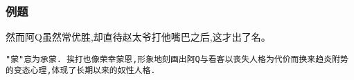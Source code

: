 \documentclass{ctexart}
\begin{document}
\subsubsection{例题}
\fangsong

然而阿Q虽然常优胜,却直待赵太爷打他嘴巴之后,这才出了名。

\texttt{"\mbox{蒙"}意为承蒙. 挨打也像荣幸蒙恩,形象地刻画出阿Q与看客以丧失人格为代价而换来趋炎附势的变态心理,体现了长期以来的奴性人格.} %
\end{document}
